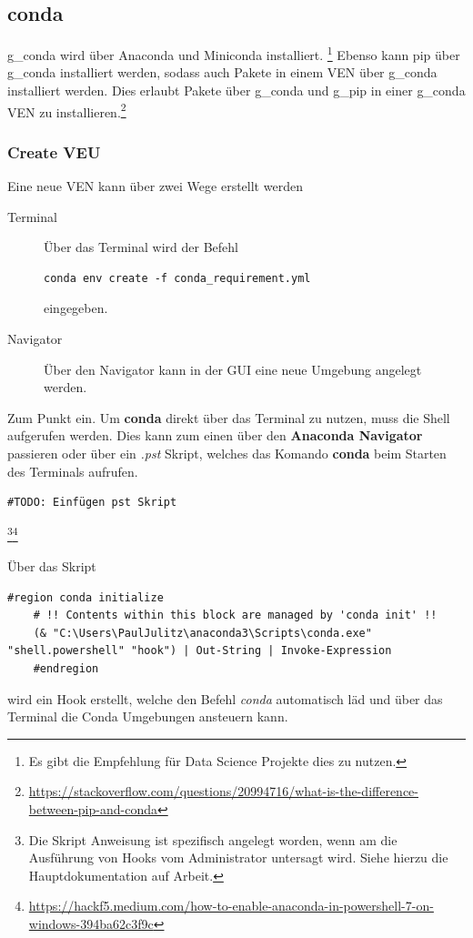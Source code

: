 \subsection{conda}

\gls{g_conda} wird über Anaconda und Miniconda installiert. \footnote{
	Es gibt die Empfehlung für Data Science Projekte dies zu nutzen.
}
Ebenso kann pip über \gls{g_conda} installiert werden, sodass auch Pakete in einem \gls{VEN} über \gls{g_conda} installiert werden. Dies erlaubt Pakete über \gls{g_conda} und \gls{g_pip} in einer \gls{g_conda} \gls{VEN} zu installieren.\footnote{
	\href{Quelle}{https://stackoverflow.com/questions/20994716/what-is-the-difference-between-pip-and-conda}
}

\subsubsection{Create VEU} 
Eine neue \gls{VEN} kann über zwei Wege erstellt werden
\begin{description}
	\item[Terminal] Über das Terminal wird der Befehl
	\begin{lstlisting}[style=CMD]
	conda env create -f conda_requirement.yml
	\end{lstlisting} eingegeben. 
	\item[Navigator] Über den Navigator kann in der \gls{GUI} eine neue Umgebung angelegt werden.
\end{description}

Zum Punkt ein. Um \textbf{conda} direkt über das Terminal zu nutzen, muss die Shell aufgerufen werden. Dies kann zum einen über den \textbf{Anaconda Navigator} passieren oder über ein \textit{.pst} Skript, welches das Komando  \textbf{conda} beim Starten des Terminals aufrufen.
\begin{lstlisting}[style=Config]
	#TODO: Einfügen pst Skript
\end{lstlisting}
\footnote{
	Die Skript Anweisung ist spezifisch angelegt worden, wenn am die Ausführung von Hooks vom Administrator untersagt wird.	 Siehe hierzu die Hauptdokumentation auf Arbeit.
}\footnote{
 \href{Quelle}{https://hackf5.medium.com/how-to-enable-anaconda-in-powershell-7-on-windows-394ba62c3f9c} 
}

Über das Skript
\begin{lstlisting}[style=CMD]
	#region conda initialize
	# !! Contents within this block are managed by 'conda init' !!
	(& "C:\Users\PaulJulitz\anaconda3\Scripts\conda.exe" "shell.powershell" "hook") | Out-String | Invoke-Expression
	#endregion
\end{lstlisting} wird ein Hook erstellt, welche den Befehl \textit{conda} automatisch läd und über das Terminal die Conda Umgebungen ansteuern kann.


